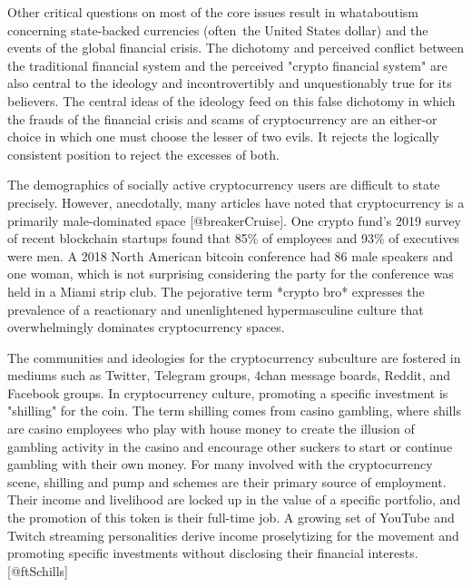 
Other critical questions on most of the core issues result in whataboutism
concerning state-backed currencies (often the United States dollar) and the
events of the global financial crisis. The dichotomy and perceived conflict
between the traditional financial system and the perceived "crypto financial
system" are also central to the ideology and incontrovertibly and unquestionably
true for its believers. The central ideas of the ideology feed on this false
dichotomy in which the frauds of the financial crisis and scams of
cryptocurrency are an either-or choice in which one must choose the lesser of
two evils. It rejects the logically consistent position to reject the excesses
of both. \cite{@golumbia2016politics; @ftLibertarian}


The demographics of socially active cryptocurrency users are difficult to state
precisely. However, anecdotally, many articles have noted that cryptocurrency is
a primarily male-dominated space [@breakerCruise]. One crypto fund's 2019 survey
of recent blockchain startups found that 85\% of employees and 93\% of executives
were men. A 2018 North American bitcoin conference had 86 male speakers and one
woman, which is not surprising considering the party for the conference was held
in a Miami strip club. The pejorative term *crypto bro* expresses the prevalence
of a reactionary and unenlightened hypermasculine culture that overwhelmingly
dominates cryptocurrency spaces.


The communities and ideologies for the cryptocurrency subculture are fostered in
mediums such as Twitter, Telegram groups, 4chan message boards, Reddit, and
Facebook groups. In cryptocurrency culture, promoting a specific investment is
"shilling" for the coin. The term shilling comes from casino gambling, where
shills are casino employees who play with house money to create the illusion of
gambling activity in the casino and encourage other suckers to start or continue
gambling with their own money. For many involved with the cryptocurrency scene,
shilling and pump and schemes are their primary source of employment. Their
income and livelihood are locked up in the value of a specific portfolio, and
the promotion of this token is their full-time job. A growing set of YouTube and
Twitch streaming personalities derive income proselytizing for the movement and
promoting specific investments without disclosing their financial interests.
[@ftSchills]

